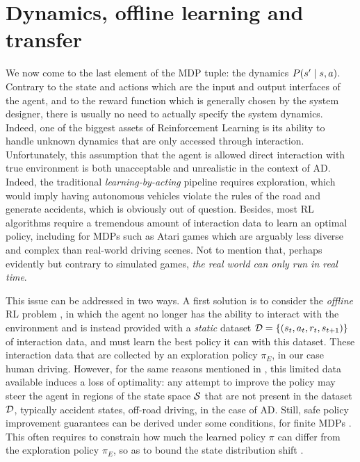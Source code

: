 \section{Dynamics, offline learning and transfer}

We now come to the last element of the \acl*{MDP} tuple: the dynamics $P\lparen s'\mid s,a\rparen$. Contrary to the state and actions which are the input and output interfaces of the agent, and to the reward function which is generally chosen by the system designer, there is usually no need to actually specify the system dynamics. Indeed, one of the biggest assets of Reinforcement Learning is its ability to handle unknown dynamics that are only accessed through interaction. Unfortunately, this assumption that the agent is allowed direct interaction with true environment is both unacceptable and unrealistic in the context of \acl*{AD}. Indeed, the traditional \emph{learning-by-acting} pipeline requires exploration, which would imply having autonomous vehicles violate the rules of the road and generate accidents, which is obviously out of question. Besides, most \acl*{RL} algorithms require a tremendous amount of interaction data to learn an optimal policy, including for \acp*{MDP} such as Atari games which are arguably less diverse and complex than real-world driving scenes. Not to mention that, perhaps evidently but contrary to simulated games, \emph{the real world can only run in real time}.

This issue can be addressed in two ways. A first solution is to consider the \emph{offline} \acl*{RL} problem \citep{levine2020offline}, in which the agent no longer has the ability to interact with the environment and is instead provided with a \emph{static} dataset $\mathcal{D} = \{(s_t, a_t, r_t, s_{t+1})\}$ of interaction data, and must learn the best policy it can with this dataset. These interaction data that are collected by an exploration policy $\pi_E$, in our case human driving. However, for the same reasons mentioned in , this limited data available induces a loss of optimality: any attempt to improve the policy may steer the agent in regions of the state space $\mathcal{S}$ that are not present in the dataset $\mathcal{D}$, typically accident states, off-road driving, \etc in the case of \acl*{AD}. Still, safe policy improvement guarantees can be derived under some conditions, \eg for finite \acp*{MDP} \citep{Laroche2019,Nadjahi2019}. This often requires to constrain how much the learned policy $\pi$ can differ from the exploration policy $\pi_E$, so as to bound the state distribution shift \citep{Kakade2002,Schulman2015}.


